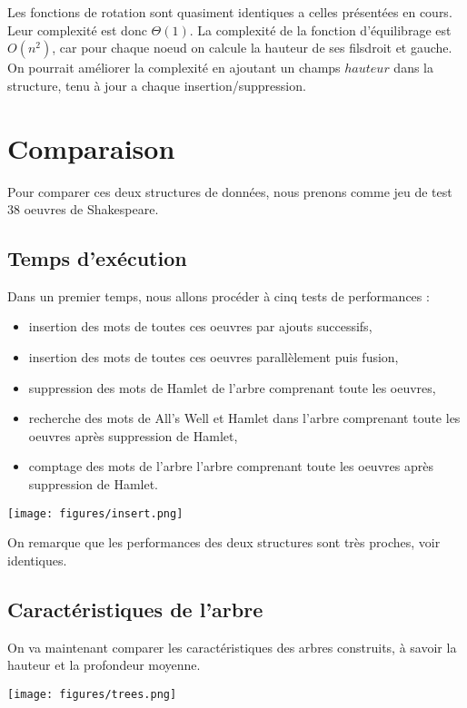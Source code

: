 \documentclass[11pt]{report} %
\begin{document}
Les fonctions de rotation sont quasiment identiques a celles présentées en cours. Leur complexité est donc $\Theta(1)$. La complexité de la fonction d'équilibrage est $O(n^2)$, car pour chaque noeud on calcule la hauteur de ses filsdroit et gauche. On pourrait améliorer la complexité en ajoutant un champs $hauteur$ dans la structure, tenu à jour a chaque insertion/suppression.

\chapter{Comparaison}

Pour comparer ces deux structures de données, nous prenons comme jeu de test 38 oeuvres de Shakespeare.

\section{Temps d'exécution}

Dans un premier temps, nous allons procéder à cinq tests de performances :
\begin{itemize}
\item insertion des mots de toutes ces oeuvres par ajouts successifs,
\item insertion des mots de toutes ces oeuvres parallèlement puis fusion,
\item suppression des mots de Hamlet de l'arbre comprenant toute les oeuvres,
\item recherche des mots de All's Well et Hamlet dans l'arbre comprenant toute les oeuvres après suppression de Hamlet,
\item comptage des mots de l'arbre l'arbre comprenant toute les oeuvres après suppression de Hamlet.
\end{itemize}

\begin{center}
\texttt{[image: figures/insert.png]}
\end{center}

On remarque que les performances des deux structures sont très proches, voir identiques.

\section{Caractéristiques de l'arbre}

On va maintenant comparer les caractéristiques des arbres construits, à savoir la hauteur et la profondeur moyenne.
\begin{center}
\texttt{[image: figures/trees.png]}
\end{center}
\end{document}

